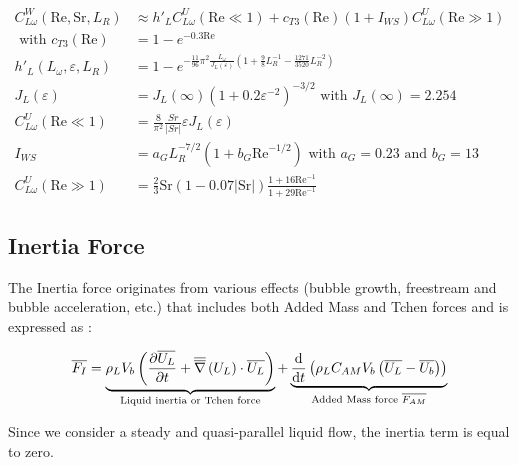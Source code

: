 \npar
\begin{align}
C_{L\omega}^{W}\left(\text{Re}, \text{Sr}, L_{R}\right) &\approx h'_{L}C_{L\omega}^{U}\left(\text{Re}\ll 1\right) + c_{T3}\left(\text{Re}\right)\left(1+I_{WS}\right)C_{L\omega}^{U}\left(\text{Re}\gg 1\right) \\
\text{ with } c_{T3}\left(\text{Re}\right) &= 1-e^{-0.3\text{Re}}\\
h'_{L}\left(L_{\omega}, \varepsilon, L_{R}\right)&=1-e^{ -\frac{11}{96}\pi^{2}\frac{L_{\omega}}{J_{L}(\varepsilon)}\left(1+\frac{9}{8}L_{R}^{-1}-\frac{1271}{3520}L_{R}^{-2}\right)} \\
J_{L}(\varepsilon)&=J_{L}\left(\infty\right)\left(1+0.2\varepsilon^{-2}\right)^{-3/2} \text{ with } J_{L}\left(\infty\right)=2.254 \\
C_{L \omega}^{U}\left(\text{Re}\ll 1\right) &= \frac{8}{\pi^{2}} \frac{Sr}{\left|Sr\right|}\varepsilon J_{L}(\varepsilon)\\
I_{WS}&=a_{G}L_{R}^{-7/2}\left(1+b_{G}\text{Re}^{-1/2}\right) \text{ with } a_{G}=0.23 \text { and } b_{G}=13\\
C_{L \omega}^{U}\left(\text{Re}\gg 1 \right)&=\frac{2}{3}\text{Sr}\left(1-0.07\left|\text{Sr}\right|\right)\frac{1+16\text{Re}^{-1}}{1+29\text{Re}^{-1}}
\end{align}










\subsection{Inertia Force}
\label{subsec:AM}

The Inertia force originates from various effects (bubble growth, freestream and bubble acceleration, etc.) that includes both Added Mass and Tchen forces and is expressed as \cite{magnaudet_motion_2000}:

\begin{equation}
\overline{F_{I}} = \underbrace{ \rho_{L}V_{b}\left( \frac{\partial{\overline{U_{L}}}}{\partial t}+\overline{\overline{\nabla}}\left({U_{L}}\right)\cdot \overline{U_{L}} \right) }_{\text{Liquid inertia or Tchen force}} + \underbrace{ \frac{\mathrm{d}}{\mathrm{d}t}\left( \rho_{L}C_{AM}V_{b}\left( \overline{U_{L}}-\overline{U_{b}} \right) \right) }_{\text{Added Mass force } \overline{F_{AM}}}
\label{eq:F_inertia}
\end{equation}

Since we consider a steady and quasi-parallel liquid flow, the inertia term is equal to zero.



